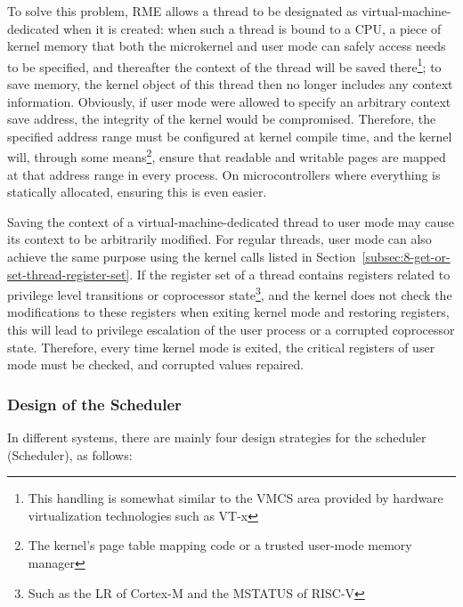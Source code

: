To solve this problem, RME allows a thread to be designated as virtual-machine-dedicated when it is created: when such a thread is bound to a CPU, a piece of kernel memory that both the microkernel and user mode can safely access needs to be specified, and thereafter the context of the thread will be saved there\footnote{This handling is somewhat similar to the VMCS area provided by hardware virtualization technologies such as VT-x}; to save memory, the kernel object of this thread then no longer includes any context information. Obviously, if user mode were allowed to specify an arbitrary context save address, the integrity of the kernel would be compromised. Therefore, the specified address range must be configured at kernel compile time, and the kernel will, through some means\footnote{The kernel's page table mapping code or a trusted user-mode memory manager}, ensure that readable and writable pages are mapped at that address range in every process. On microcontrollers where everything is statically allocated, ensuring this is even easier.

Saving the context of a virtual-machine-dedicated thread to user mode may cause its context to be arbitrarily modified. For regular threads, user mode can also achieve the same purpose using the kernel calls listed in Section~\ref{subsec:8-get-or-set-thread-register-set}. If the register set of a thread contains registers related to privilege level transitions or coprocessor state\footnote{Such as the LR of Cortex-M and the MSTATUS of RISC-V}, and the kernel does not check the modifications to these registers when exiting kernel mode and restoring registers, this will lead to privilege escalation of the user process or a corrupted coprocessor state. Therefore, every time kernel mode is exited, the critical registers of user mode must be checked, and corrupted values repaired.

\subsubsection{Design of the Scheduler}\label{subsubsec:4-scheduler-design}

In different systems, there are mainly four design strategies for the scheduler (Scheduler), as follows:

